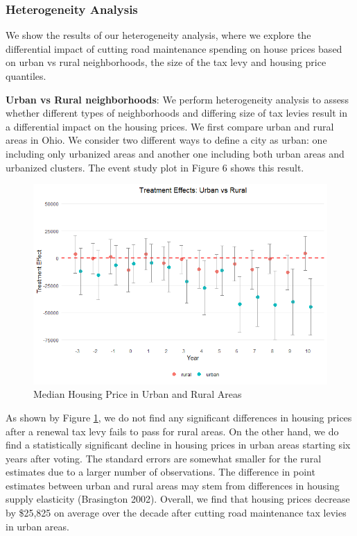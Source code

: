 \subsubsection{Heterogeneity Analysis} We show the results of our heterogeneity analysis, where we explore the differential impact of cutting road maintenance spending on house prices based on urban vs rural neighborhoods, the size of the tax levy and housing price quantiles.

\vskip 0.5cm

\textbf{Urban vs Rural neighborhoods}: We perform heterogeneity analysis to assess whether different types of neighborhoods and differing size of tax levies result in a differential impact on the housing prices. We first compare urban and rural areas in Ohio. We consider two different ways to define a city as urban:  one including only urbanized areas and another one including both urban areas and urbanized clusters. The event study plot in Figure 6 shows this result. 

\begin{figure}[htbp]
    \centering
    \includegraphics[width=\textwidth,keepaspectratio]{images/tes_covs_ua_new.png}
    \caption{Median Housing Price in Urban and Rural Areas}
    \label{fig:tes_covs_ua}
\end{figure}

As shown by Figure \ref{fig:tes_covs_ua}, we do not find any significant differences in housing prices after a renewal tax levy fails to pass for rural areas. On the other hand, we do find a statistically significant decline in housing prices in urban areas starting six years after voting. The standard errors are somewhat smaller for the rural estimates due to a larger number of observations. The difference in point estimates between urban and rural areas may stem from differences in housing supply elasticity (Brasington 2002). Overall, we find that housing prices decrease by \$25,825 on average over the decade after cutting road maintenance tax levies in urban areas. 

